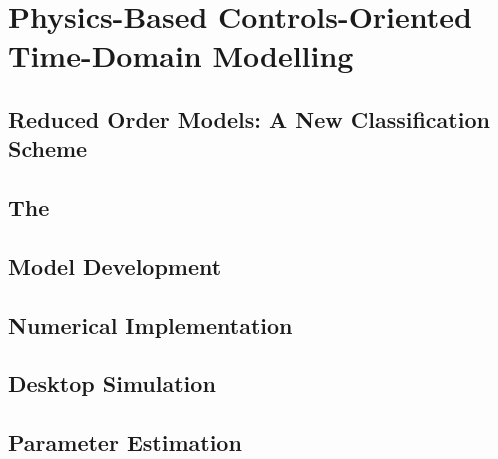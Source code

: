 
\chapter{Physics-Based Controls-Oriented Time-Domain Modelling}

\graphicspath{{4/figures/}}

\section{Reduced Order Models: A New Classification Scheme}\label{sec:classificationscheme}


\section{The }\label{sec:spmintro}


\section{ Model Development}\label{sec:spmmodeldevelopment}


\section{Numerical Implementation}\label{sec:numericalimplementation}


\section{Desktop Simulation}\label{sec:basicspmsimresults}


\section{ Parameter Estimation}\label{sec:spmparameterestim}
